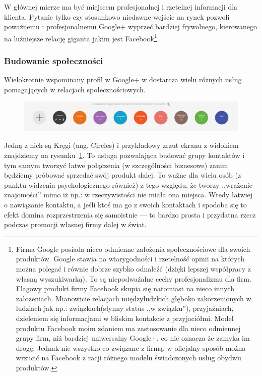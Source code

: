 W głównej mierze ma być miejscem profesjonalnej i rzetelnej informacji dla klienta. Pytanie tylko czy stosunkowo niedawne wejście na rynek pozwoli poważnemu i profesjonalnemu Google+ wyprzeć bardziej frywolnego, kierowanego na luźniejsze relację giganta jakim jest Facebook\footnote{Firma Google posiada nieco odmienne założenia społecznościowe dla swoich produktów. Google stawia na wiarygodności i rzetelność opinii na których można polegać i równie dobrze szybko odnaleźć (dzięki lepszej współpracy z własną wyszukiwarką). To są niepodważalne cechy profesjonalizmu dla firm. 
Flagowy produkt firmy Facebook skupia się natomiast na nieco innych założeniach. Mianowicie relacjach międzyludzkich głęboko zakorzenionych w ludziach jak np.: związkach(słynny status ,,w związku''), przyjaźniach, dzieleniem się informacjami w bliskim kontakcie z przyjaciółmi. Model produktu Facebook moim zdaniem ma zastosowanie dla nieco odmiennej grupy firm, niż bardziej uniwersalny Google+, co nie oznacza że zamyka im drogę. Jednak nie wszystko co związane z firmą, w oficjalny sposób można wrzucić na Facebook z racji różnego modelu świadczonych usług obydwu produktów.}.


\subsubsection{Budowanie społeczności}
Wielokrotnie wspominany profil w Google+ w dostarcza wielu różnych usług pomagających w relacjach społecznościowych.

\begin{figure}[!h]
\centering
    \scalebox{0.25}
    {
        \includegraphics{images/google-plus-circles.png}
    }
    \label{fig:google-plus-circles}
\end{figure}

Jedną z nich są Kręgi (ang. Circles) i przykładowy zrzut ekranu z widokiem znajdziemy na rysunku~\ref{fig:google-plus-circles}. To usługa pozwalająca budować grupy kontaktów i tym samym tworzyć łatwe połączenia (w szczególności biznesowe) zanim będziemy próbować sprzedać swój produkt dalej. To ważne dla wielu osób (z punktu widzenia psychologicznego również) z tego względu, że tworzy ,,wrażenie znajomości'' mimo iż np.: w rzeczywistości nie miała ona miejsca.
Wtedy łatwiej o nawiązanie kontaktu, a jeśli ktoś ma go z swoich kontaktach i spodoba się to efekt domina rozprzestrzenia się samoistnie --- to bardzo prosta i przydatna rzecz podczas promocji własnej firmy dalej w świat.

